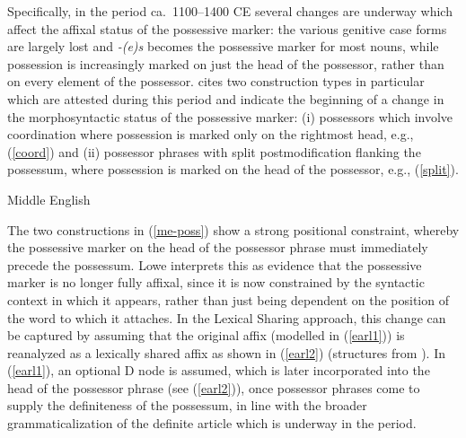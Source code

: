 \documentclass[output=paper,hidelinks]{langscibook}
\begin{document}
Specifically, in the period ca.~1100--1400 CE %
several changes are underway which affect the affixal status of the possessive marker: the various genitive case forms are largely lost and \textit{-(e)s} becomes the possessive marker for most nouns, while possession is increasingly marked on just the head of the possessor, rather than on every element of the possessor. \citet{Lowe15} cites two construction types in particular which are attested during this period and indicate the beginning of a change in the morphosyntactic status of the possessive marker: (i) possessors which involve coordination where possession is marked only on the rightmost head, e.g., (\ref{coord}) and (ii) possessor phrases with split postmodification flanking the possessum, where possession is marked on the head of the possessor, e.g., (\ref{split}). %

\begin{exe}
\ex \label{me-poss} Middle English
\begin{xlist}
\end{xlist}
\end{exe}

\noindent The two constructions in (\ref{me-poss}) show a strong positional constraint, whereby the possessive marker on the head of the possessor phrase must immediately precede the possessum. Lowe interprets this as evidence that the possessive marker is no longer fully affixal, since it is now constrained by the syntactic context in which it appears, rather than just being dependent on the position of the word to which it attaches. In the Lexical Sharing approach, this change can be captured by assuming that the original affix (modelled in (\ref{earl1}))  is reanalyzed as a lexically shared affix as shown in (\ref{earl2}) (structures from \citealp[222]{Lowe15}). In (\ref{earl1}), an optional D node is assumed, 
which is later incorporated into the head of the possessor phrase (see (\ref{earl2})), once possessor phrases come to supply the definiteness of the possessum, in line with the broader grammaticalization of the definite article which is underway in the period. 
\end{document}
